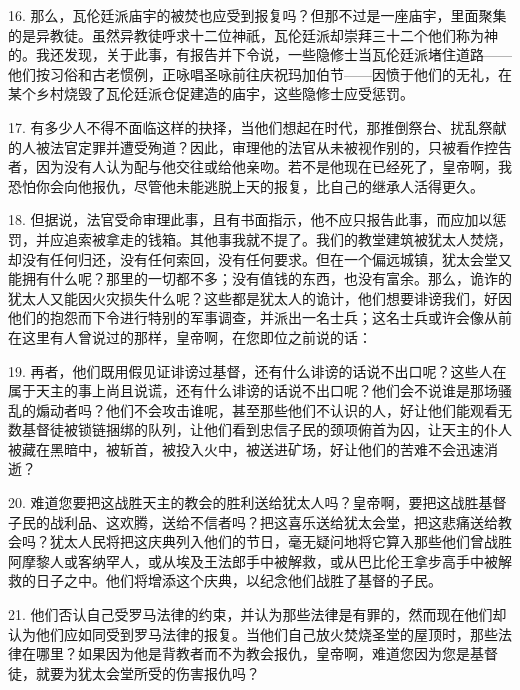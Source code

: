 16. 那么，瓦伦廷派庙宇的被焚也应受到报复吗？但那不过是一座庙宇，里面聚集的是异教徒。虽然异教徒呼求十二位神祇，瓦伦廷派却崇拜三十二个他们称为神的。我还发现，关于此事，有报告并下令说，一些隐修士当瓦伦廷派堵住道路——他们按习俗和古老惯例，正咏唱圣咏前往庆祝玛加伯节——因愤于他们的无礼，在某个乡村烧毁了瓦伦廷派仓促建造的庙宇，这些隐修士应受惩罚。\par

17. 有多少人不得不面临这样的抉择，当他们想起在时代，那推倒祭台、扰乱祭献的人被法官定罪并遭受殉道？因此，审理他的法官从未被视作别的，只被看作控告者，因为没有人认为配与他交往或给他亲吻。若不是他现在已经死了，皇帝啊，我恐怕你会向他报仇，尽管他未能逃脱上天的报复，比自己的继承人活得更久。\par

18. 但据说，法官受命审理此事，且有书面指示，他不应只报告此事，而应加以惩罚，并应追索被拿走的钱箱。其他事我就不提了。我们的教堂建筑被犹太人焚烧，却没有任何归还，没有任何索回，没有任何要求。但在一个偏远城镇，犹太会堂又能拥有什么呢？那里的一切都不多；没有值钱的东西，也没有富余。那么，诡诈的犹太人又能因火灾损失什么呢？这些都是犹太人的诡计，他们想要诽谤我们，好因他们的抱怨而下令进行特别的军事调查，并派出一名士兵；这名士兵或许会像从前在这里有人曾说过的那样，皇帝啊，在您即位之前说的话：\par

19. 再者，他们既用假见证诽谤过基督，还有什么诽谤的话说不出口呢？这些人在属于天主的事上尚且说谎，还有什么诽谤的话说不出口呢？他们会不说谁是那场骚乱的煽动者吗？他们不会攻击谁呢，甚至那些他们不认识的人，好让他们能观看无数基督徒被锁链捆绑的队列，让他们看到忠信子民的颈项俯首为囚，让天主的仆人被藏在黑暗中，被斩首，被投入火中，被送进矿场，好让他们的苦难不会迅速消逝？\par

20. 难道您要把这战胜天主的教会的胜利送给犹太人吗？皇帝啊，要把这战胜基督子民的战利品、这欢腾，送给不信者吗？把这喜乐送给犹太会堂，把这悲痛送给教会吗？犹太人民将把这庆典列入他们的节日，毫无疑问地将它算入那些他们曾战胜阿摩黎人或客纳罕人，或从埃及王法郎手中被解救，或从巴比伦王拿步高手中被解救的日子之中。他们将增添这个庆典，以纪念他们战胜了基督的子民。\par

21. 他们否认自己受罗马法律的约束，并认为那些法律是有罪的，然而现在他们却认为他们应如同受到罗马法律的报复。当他们自己放火焚烧圣堂的屋顶时，那些法律在哪里？如果因为他是背教者而不为教会报仇，皇帝啊，难道您因为您是基督徒，就要为犹太会堂所受的伤害报仇吗？\par

